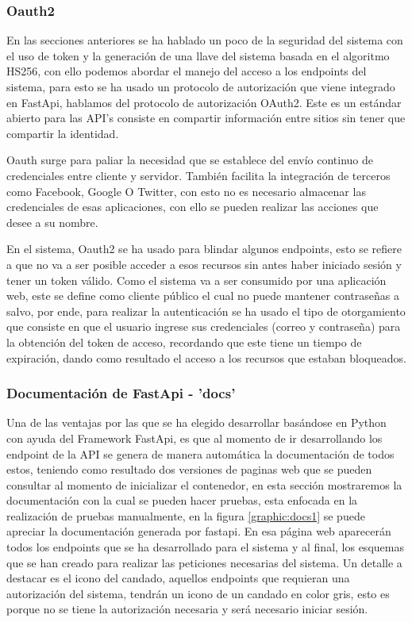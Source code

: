 \clearpage
\subsubsection{Oauth2}
En las secciones anteriores se ha hablado un poco de la seguridad del sistema con el uso de token y la generación de una llave del sistema basada en el algoritmo HS256, con ello podemos abordar el manejo del acceso a los endpoints del sistema, para esto se ha usado un protocolo de autorización que viene integrado en FastApi, hablamos del protocolo de autorización OAuth2. Este es un estándar abierto para las API's consiste en compartir información entre sitios sin tener que compartir la identidad.

Oauth surge para paliar la necesidad que se establece del envío continuo de credenciales entre cliente y servidor. También facilita la integración de terceros como Facebook, Google O Twitter, con esto no es necesario almacenar las credenciales de esas aplicaciones, con ello se pueden realizar las acciones que desee a su nombre.

En el sistema, Oauth2 se ha usado para blindar algunos endpoints, esto se refiere a que no va a ser posible acceder a esos recursos sin antes haber iniciado sesión y tener un token válido. Como el sistema va a ser consumido por una aplicación web, este se define como cliente público el cual no puede mantener contraseñas a salvo, por ende, para realizar la autenticación se ha usado el tipo de otorgamiento que consiste en que el usuario ingrese sus credenciales (correo y contraseña) para la obtención del token de acceso, recordando que este tiene un tiempo de expiración, dando como resultado el acceso a los recursos que estaban bloqueados.

\subsubsection{Documentación de FastApi - 'docs'}
Una de las ventajas por las que se ha elegido desarrollar basándose en Python con ayuda del Framework FastApi, es que al momento de ir desarrollando los endpoint de la API se genera de manera automática la documentación de todos estos, teniendo como resultado dos versiones de paginas web que se pueden consultar al momento de inicializar el contenedor, en esta sección mostraremos la documentación con la cual se pueden hacer pruebas, esta enfocada en la realización de pruebas manualmente, en la figura \ref{graphic:docs1} se puede apreciar la documentación generada por fastapi. En esa página web aparecerán todos los endpoints que se ha desarrollado para el sistema y al final, los esquemas que se han creado para realizar las peticiones necesarias del sistema. Un detalle a destacar es el icono del candado, aquellos endpoints que requieran una autorización del sistema, tendrán un icono de un candado en color gris, esto es porque no se tiene la autorización necesaria y será necesario iniciar sesión.

